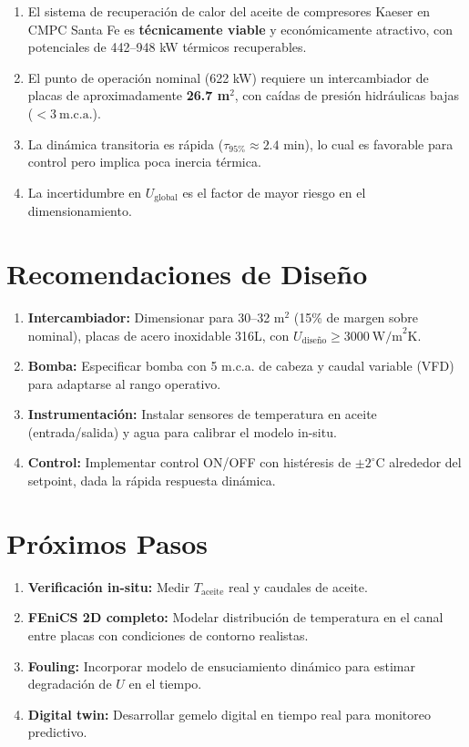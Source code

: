 \documentclass[11pt,a4paper]{report}
\begin{document}
\begin{enumerate}
  \item El sistema de recuperación de calor del aceite de compresores Kaeser en CMPC Santa Fe es \textbf{técnicamente viable} y económicamente atractivo, con potenciales de 442--948 kW térmicos recuperables.
  \item El punto de operación nominal (622 kW) requiere un intercambiador de placas de aproximadamente \textbf{26.7 m$^2$}, con caídas de presión hidráulicas bajas ($< 3\ \text{m.c.a.}$).
  \item La dinámica transitoria es rápida ($\tau_{95\%} \approx 2.4$ min), lo cual es favorable para control pero implica poca inercia térmica.
  \item La incertidumbre en $U_{\text{global}}$ es el factor de mayor riesgo en el dimensionamiento.
\end{enumerate}

\section{Recomendaciones de Diseño}

\begin{enumerate}
  \item \textbf{Intercambiador:} Dimensionar para 30--32 m$^2$ (15\% de margen sobre nominal), placas de acero inoxidable 316L, con $U_{\text{diseño}} \geq 3000\ \text{W/m}^2\text{K}$.
  \item \textbf{Bomba:} Especificar bomba con 5 m.c.a. de cabeza y caudal variable (VFD) para adaptarse al rango operativo.
  \item \textbf{Instrumentación:} Instalar sensores de temperatura en aceite (entrada/salida) y agua para calibrar el modelo in-situ.
  \item \textbf{Control:} Implementar control ON/OFF con histéresis de $\pm 2^\circ\text{C}$ alrededor del setpoint, dada la rápida respuesta dinámica.
\end{enumerate}

\section{Próximos Pasos}

\begin{enumerate}
  \item \textbf{Verificación in-situ:} Medir $T_{\text{aceite}}$ real y caudales de aceite.
  \item \textbf{FEniCS 2D completo:} Modelar distribución de temperatura en el canal entre placas con condiciones de contorno realistas.
  \item \textbf{Fouling:} Incorporar modelo de ensuciamiento dinámico para estimar degradación de $U$ en el tiempo.
  \item \textbf{Digital twin:} Desarrollar gemelo digital en tiempo real para monitoreo predictivo.
\end{enumerate}
\end{document}
